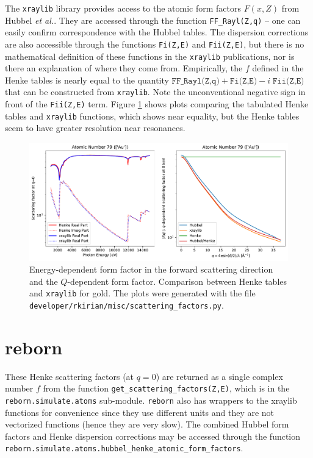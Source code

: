 \documentclass[11pt]{article}
\begin{document}
The \texttt{xraylib} library\cite{schoonjansXraylibLibraryXray2011,brunettiLibraryXrayMatter2004} provides access to the atomic form factors  $F(x,Z)$  from Hubbel {\itshape et al.}\cite{hubbellAtomicFormFactors1975}.  They are accessed through the function \texttt{FF\_Rayl(Z,q)} -- one can easily confirm correspondence with the Hubbel tables.  The dispersion corrections are also accessible through the functions \texttt{Fi(Z,E)} and \texttt{Fii(Z,E)}, but there is no mathematical definition of these functions in the \texttt{xraylib} publications, nor is there an explanation of where they come from.   Empirically, the $f$ defined in the Henke tables is nearly equal to the quantity $\texttt{FF\_Rayl(Z,q)} + \texttt{Fi(Z,E)} - i\; \texttt{Fii(Z,E)}$ that can be constructed from \texttt{xraylib}.  Note the unconventional negative sign in front of the \texttt{Fii(Z,E)} term.  Figure \ref{fig:forms} shows plots comparing the tabulated Henke tables and \texttt{xraylib} functions, which shows near equality, but the Henke tables seem to have greater resolution near resonances.
\begin{figure}[htbp]
   \centering
   \includegraphics[width=\textwidth]{figures/formfactor_79.pdf} 
   \caption{Energy-dependent form factor in the forward scattering direction and the $Q$-dependent form factor.  Comparison between Henke tables and \texttt{xraylib} for gold.  The plots were generated with the file \texttt{developer/rkirian/misc/scattering\_factors.py}.}
   \label{fig:forms}
\end{figure} 


\section{reborn}

These Henke scattering factors (at $q=0$) are returned as a single complex number $f$ from the function \texttt{get\_scattering\_factors(Z,E)}, which is in the \texttt{reborn.simulate.atoms} sub-module.  \texttt{reborn} also has wrappers to the xraylib functions for convenience since they use different units and they are not vectorized functions (hence they are very slow).  The combined Hubbel form factors and Henke dispersion corrections may be accessed through the function \texttt{reborn.simulate.atoms.hubbel\_henke\_atomic\_form\_factors}.
\end{document}

